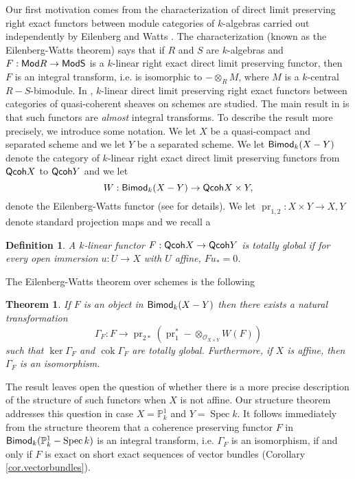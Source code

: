 \documentclass[10pt]{amsart}
\newtheorem{theorem}[lemma]{Theorem}
\newtheorem{defn}[lemma]{Definition}
\theoremstyle{definition}
\theoremstyle{remark}
\numberwithin{equation}{section}
\begin{document}
Our first motivation comes from the characterization of direct limit preserving right exact functors between module categories of $k$-algebras carried out independently by Eilenberg \cite{E} and Watts \cite{W}.  The characterization (known as the Eilenberg-Watts theorem) says that if $R$ and $S$ are $k$-algebras and $F:{\sf Mod }R \rightarrow {\sf Mod S}$ is a $k$-linear right exact direct limit preserving functor, then $F$ is an integral transform, i.e. is isomorphic to $-\otimes_{R}M$, where $M$ is a $k$-central $R-S$-bimodule.  In \cite{N}, $k$-linear direct limit preserving right exact functors between categories of quasi-coherent sheaves on schemes are studied.  The main result in \cite{N} is that such functors are {\it almost} integral transforms.  To describe the result more precisely, we introduce some notation.  We let $X$ be a quasi-compact and separated scheme and we let $Y$ be a separated scheme.  We let ${\sf Bimod}_{k}(X-Y)$ denote the category of $k$-linear right exact direct limit preserving functors from ${\sf Qcoh }X$ to ${\sf Qcoh }Y$ and we let
$$
W:{\sf Bimod}_{k}(X-Y) \rightarrow {\sf Qcoh }X  \times  Y,
$$
denote the Eilenberg-Watts functor (see \cite[Section 5]{N} for details).  We let $\operatorname{pr}_{1,2}:X \times Y \rightarrow X,Y$ denote standard projection maps and we recall a

\begin{defn} \label{defn.totallyglobal}
A $k$-linear functor $F: {\sf Qcoh }X \rightarrow {\sf Qcoh }Y$ is {\it totally global} if for every
open immersion $u:U \rightarrow X$ with $U$ affine, $Fu_{*}=0$.
\end{defn}
The Eilenberg-Watts theorem over schemes is the following

\begin{theorem} \label{thm.watts} \cite[Section 6]{N}
If $F$ is an object in ${\sf Bimod}_{k}(X-Y)$ then there exists a natural transformation
$$
\Gamma_{F}:F \longrightarrow \operatorname{pr}_{2*}(\operatorname{pr}_{1}^{*}-\otimes_{\mathcal{O}_{X \times Y}}W(F))
$$
such that $\operatorname{ker }\Gamma_{F}$
and $\operatorname{cok }\Gamma_{F}$ are totally global.  Furthermore, if $X$ is affine, then $\Gamma_{F}$ is an isomorphism.
\end{theorem}
The result leaves open the question of whether there is a more precise description of the structure of such functors when $X$ is not affine.  Our structure theorem addresses this question in case $X=\mathbb{P}^{1}_{k}$ and $Y=\operatorname{Spec }k$.  It follows immediately from the structure theorem that a coherence preserving functor $F$ in ${\sf Bimod}_{k}(\mathbb{P}^{1}_{k}-\operatorname{Spec }k)$
is an integral transform, i.e. $\Gamma_{F}$ is an isomorphism, if and only if $F$ is exact on short exact sequences of vector bundles (Corollary \ref{cor.vectorbundles}).
\end{document}
